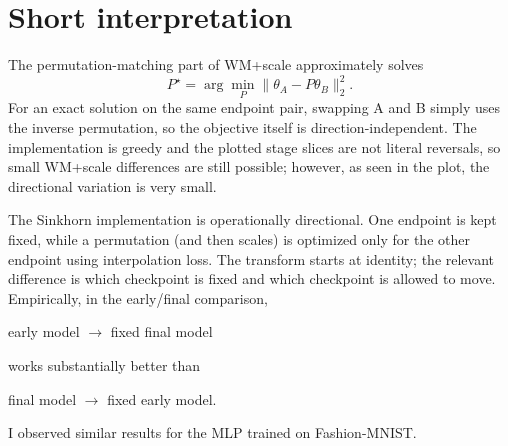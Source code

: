 \documentclass[11pt]{article}
\begin{document}
\section*{Short interpretation}

The permutation-matching part of WM+scale approximately solves
\[
    P^\star=\arg\min_P \|\theta_A-P\theta_B\|_2^2.
\]
For an exact solution on the same endpoint pair, swapping A and B simply uses
the inverse permutation, so the objective itself is direction-independent.
The implementation is greedy and the plotted stage slices are not literal
reversals, so small WM+scale differences are still possible; however, as seen
in the plot, the directional variation is very small.

The Sinkhorn implementation is operationally directional.  One endpoint is
kept fixed, while a permutation (and then scales) is optimized only for the
other endpoint using interpolation loss.  The transform starts at identity;
the relevant difference is which checkpoint is fixed and which checkpoint is
allowed to move.  Empirically, in the early/final comparison,

\begin{center}
    early model $\longrightarrow$ fixed final model
\end{center}

works substantially better than

\begin{center}
    final model $\longrightarrow$ fixed early model.
\end{center}

I observed similar results for the MLP trained on Fashion-MNIST.
\end{document}
